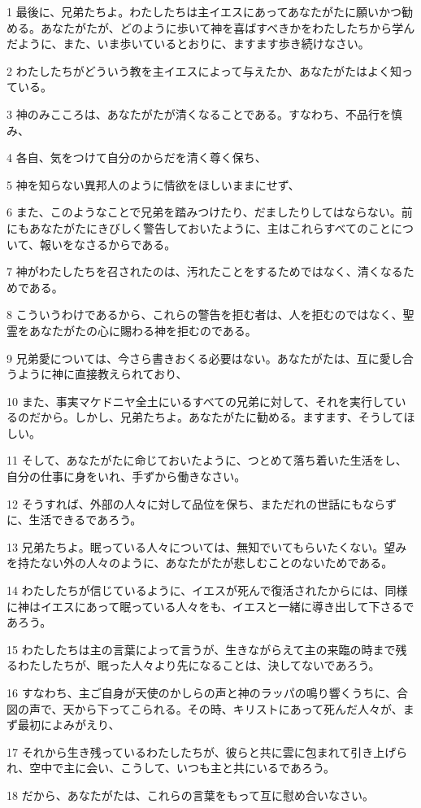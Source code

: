 \par 1 最後に、兄弟たちよ。わたしたちは主イエスにあってあなたがたに願いかつ勧める。あなたがたが、どのように歩いて神を喜ばすべきかをわたしたちから学んだように、また、いま歩いているとおりに、ますます歩き続けなさい。
\par 2 わたしたちがどういう教を主イエスによって与えたか、あなたがたはよく知っている。
\par 3 神のみこころは、あなたがたが清くなることである。すなわち、不品行を慎み、
\par 4 各自、気をつけて自分のからだを清く尊く保ち、
\par 5 神を知らない異邦人のように情欲をほしいままにせず、
\par 6 また、このようなことで兄弟を踏みつけたり、だましたりしてはならない。前にもあなたがたにきびしく警告しておいたように、主はこれらすべてのことについて、報いをなさるからである。
\par 7 神がわたしたちを召されたのは、汚れたことをするためではなく、清くなるためである。
\par 8 こういうわけであるから、これらの警告を拒む者は、人を拒むのではなく、聖霊をあなたがたの心に賜わる神を拒むのである。
\par 9 兄弟愛については、今さら書きおくる必要はない。あなたがたは、互に愛し合うように神に直接教えられており、
\par 10 また、事実マケドニヤ全土にいるすべての兄弟に対して、それを実行しているのだから。しかし、兄弟たちよ。あなたがたに勧める。ますます、そうしてほしい。
\par 11 そして、あなたがたに命じておいたように、つとめて落ち着いた生活をし、自分の仕事に身をいれ、手ずから働きなさい。
\par 12 そうすれば、外部の人々に対して品位を保ち、まただれの世話にもならずに、生活できるであろう。
\par 13 兄弟たちよ。眠っている人々については、無知でいてもらいたくない。望みを持たない外の人々のように、あなたがたが悲しむことのないためである。
\par 14 わたしたちが信じているように、イエスが死んで復活されたからには、同様に神はイエスにあって眠っている人々をも、イエスと一緒に導き出して下さるであろう。
\par 15 わたしたちは主の言葉によって言うが、生きながらえて主の来臨の時まで残るわたしたちが、眠った人々より先になることは、決してないであろう。
\par 16 すなわち、主ご自身が天使のかしらの声と神のラッパの鳴り響くうちに、合図の声で、天から下ってこられる。その時、キリストにあって死んだ人々が、まず最初によみがえり、
\par 17 それから生き残っているわたしたちが、彼らと共に雲に包まれて引き上げられ、空中で主に会い、こうして、いつも主と共にいるであろう。
\par 18 だから、あなたがたは、これらの言葉をもって互に慰め合いなさい。

